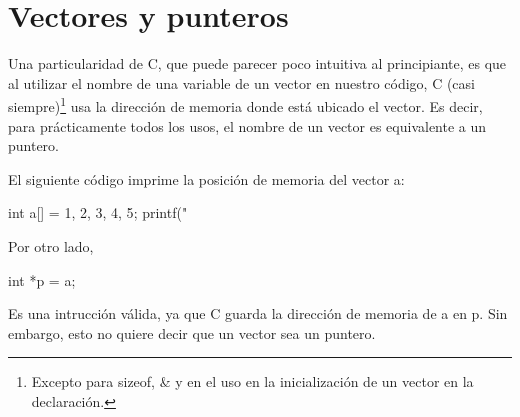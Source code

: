 
%
\renewcommand{\chaptermark}[1]{\markboth{#1}{}}
\renewcommand{\thesection}{\arabic{section}}
\chapter*{Vectores y punteros}

Una particularidad de C, que puede parecer poco intuitiva al principiante, es
que al utilizar el nombre de una variable de un vector en nuestro código, C
(casi siempre)\footnote{Excepto para sizeof, \& y en el uso en la
inicialización de un vector en la declaración.} usa la dirección de memoria
donde está ubicado el vector.  Es decir, para prácticamente todos los usos, el
nombre de un vector es equivalente a un puntero.

El siguiente código imprime la posición de memoria del vector a:
\begin{codigo-c-plano}
  int a[] = {1, 2, 3, 4, 5};
  printf("%
\end{codigo-c-plano}

Por otro lado,

\begin{codigo-c-plano}
  int *p = a;
\end{codigo-c-plano}

Es una intrucción válida, ya que C guarda la dirección de memoria de a en p.
Sin embargo, esto no quiere decir que un vector sea un puntero.

